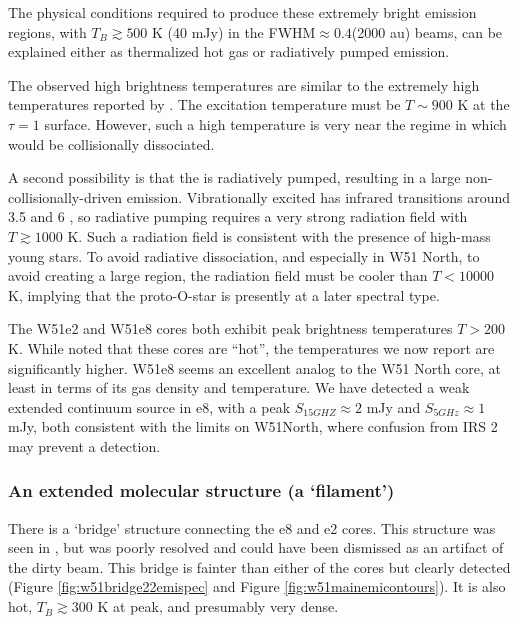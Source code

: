 The physical conditions required to produce these extremely bright emission
regions, with $T_B \gtrsim 500$ K (40 mJy) in the FWHM$\approx0.4$\arcsec (2000
au) beams, can be explained either as thermalized hot gas or radiatively pumped
emission.

The observed high brightness temperatures are similar to the extremely high
temperatures reported by \citet{Zapata2010a}.  The excitation temperature must
be $T\sim900$ K at the \formaldehyde \twotwo $\tau=1$ surface.  However, such a
high temperature is very near the regime in which \formaldehyde would be
collisionally dissociated.

A second possibility is that the \formaldehyde is radiatively pumped, resulting
in a large non-collisionally-driven emission.  Vibrationally excited
\formaldehyde has infrared
transitions around 3.5 and 6 \um \citep{Al-Refaie2015a}, so radiative pumping
requires a very strong radiation field with $T\gtrsim1000$ K.  Such a radiation
field is consistent with the presence of high-mass young stars.  To avoid
radiative dissociation, and especially in W51 North, to avoid creating a large
\hii region, the radiation field must be cooler than $T < 10000$ K,
implying that the proto-O-star \citep[as inferred from its luminosity and its
kinematically-derived mass][]{Zapata2008a,Zapata2009a} is presently at a later
spectral type.



The W51e2 and W51e8 cores both exhibit peak brightness temperatures $T>200$ K.
While \citet{Zhang1997a} noted that these cores are ``hot'', the temperatures
we now report are significantly higher.  W51e8 seems an excellent analog to the
W51 North core, at least in terms of its gas density and temperature.  We have
detected a weak extended continuum source in e8, with a peak $S_{15 GHZ}
\approx 2$ mJy and $S_{5 GHz} \approx 1$ mJy, both consistent with the limits
on W51North, where confusion from IRS 2 may prevent a detection.

\subsubsection{An extended molecular structure (a `filament')}
There is a `bridge' structure connecting the e8 and e2 cores.  This structure
was seen in \citet{Zhang1997a}, but was poorly resolved and could have been
dismissed as an artifact of the dirty beam.  This bridge is fainter than either
of the cores but clearly detected (Figure \ref{fig:w51bridge22emispec} and
Figure \ref{fig:w51mainemicontours}).  It is also hot, $T_B\gtrsim300$ K at peak,
and presumably very dense.


